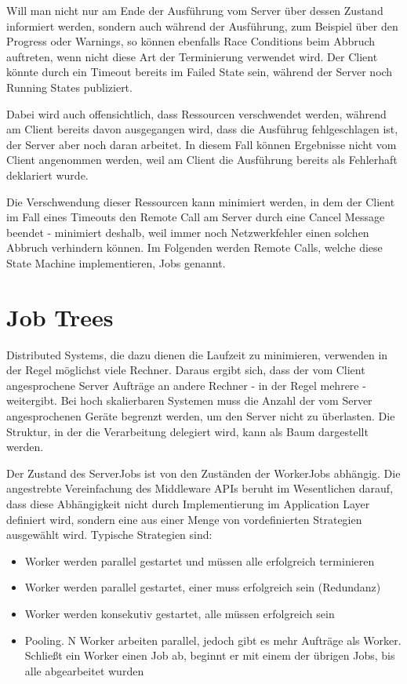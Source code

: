 Will man nicht nur am Ende der Ausführung vom Server über dessen Zustand informiert werden, sondern auch während der Ausführung, zum Beispiel über den Progress oder Warnings, so können ebenfalls Race Conditions beim Abbruch auftreten, wenn nicht diese Art der Terminierung verwendet wird.
Der Client könnte durch ein Timeout bereits im Failed State sein, während der Server noch Running States publiziert.

Dabei wird auch offensichtlich, dass Ressourcen verschwendet werden,  während am Client bereits davon ausgegangen wird, dass die Ausführug fehlgeschlagen ist, der Server aber noch daran arbeitet.
In diesem Fall können Ergebnisse nicht vom Client angenommen werden, weil am Client die Ausführung bereits als Fehlerhaft deklariert wurde.

Die Verschwendung dieser Ressourcen kann minimiert werden, in dem der Client im Fall eines Timeouts den Remote Call am Server durch eine Cancel Message beendet
- minimiert deshalb, weil immer noch Netzwerkfehler einen solchen Abbruch verhindern können.
Im Folgenden werden Remote Calls, welche diese State Machine implementieren, Jobs genannt.




\section{Job Trees}
Distributed Systems, die dazu dienen die Laufzeit zu minimieren, verwenden in der Regel möglichst viele Rechner.
Daraus ergibt sich, dass der vom Client angesprochene Server Aufträge an andere Rechner - in der Regel mehrere - weitergibt.
Bei hoch skalierbaren Systemen muss die Anzahl der vom Server angesprochenen Geräte begrenzt werden, um den Server nicht zu überlasten.
Die Struktur, in der die Verarbeitung delegiert wird, kann als Baum dargestellt werden.

Der Zustand des ServerJobs ist von den Zuständen der WorkerJobs abhängig.
Die angestrebte Vereinfachung des Middleware APIs  beruht im Wesentlichen darauf, dass diese Abhängigkeit nicht durch Implementierung im Application Layer definiert wird, sondern eine aus einer Menge von vordefinierten Strategien ausgewählt wird.
Typische Strategien sind:

\begin{itemize}
  \item Worker werden parallel gestartet und müssen alle erfolgreich terminieren
  \item Worker werden parallel gestartet, einer muss erfolgreich sein (Redundanz)
  \item Worker werden konsekutiv gestartet, alle müssen erfolgreich sein
  \item Pooling. N Worker arbeiten parallel, jedoch gibt es mehr Aufträge als Worker. Schließt ein Worker einen Job ab, beginnt er mit einem der übrigen Jobs, bis alle abgearbeitet wurden
\end{itemize}


